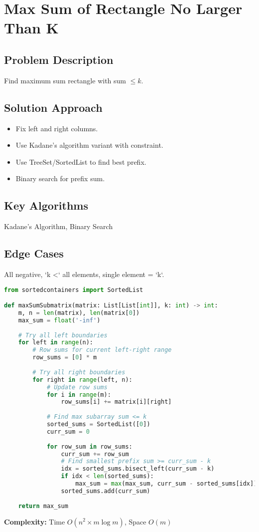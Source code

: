\documentclass[10pt, a4paper]{article}
\begin{document}
\section{Max Sum of Rectangle No Larger Than K}
\subsection*{Problem Description}
Find maximum sum rectangle with sum $\le k$.

\subsection*{Solution Approach}
\begin{itemize}
    \item Fix left and right columns.
    \item Use Kadane's algorithm variant with constraint.
    \item Use TreeSet/SortedList to find best prefix.
    \item Binary search for prefix sum.
\end{itemize}

\subsection*{Key Algorithms}
Kadane's Algorithm, Binary Search

\subsection*{Edge Cases}
All negative, `k <` all elements, single element = `k`.

\begin{lstlisting}[language=Python]
from sortedcontainers import SortedList

def maxSumSubmatrix(matrix: List[List[int]], k: int) -> int:
    m, n = len(matrix), len(matrix[0])
    max_sum = float('-inf')
    
    # Try all left boundaries
    for left in range(n):
        # Row sums for current left-right range
        row_sums = [0] * m
        
        # Try all right boundaries
        for right in range(left, n):
            # Update row sums
            for i in range(m):
                row_sums[i] += matrix[i][right]
            
            # Find max subarray sum <= k
            sorted_sums = SortedList([0])
            curr_sum = 0
            
            for row_sum in row_sums:
                curr_sum += row_sum
                # Find smallest prefix sum >= curr_sum - k
                idx = sorted_sums.bisect_left(curr_sum - k)
                if idx < len(sorted_sums):
                    max_sum = max(max_sum, curr_sum - sorted_sums[idx])
                sorted_sums.add(curr_sum)
    
    return max_sum
\end{lstlisting}
\textbf{Complexity:} Time $O(n^2 \times m \log m)$, Space $O(m)$
\end{document}

